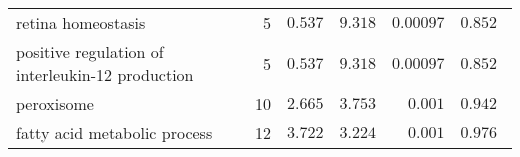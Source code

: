 \begin{longtable}{|l|r|r|r|r|r|}
                                retina homeostasis &                       5 &                $ 0.537$ &   $ 9.318$ &            $0.00097$ &                    $ 0.852~~$ \\
  positive regulation of interleukin-12 production &                       5 &                $ 0.537$ &   $ 9.318$ &            $0.00097$ &                    $ 0.852~~$ \\
                                        peroxisome &                      10 &                $ 2.665$ &   $ 3.753$ &             $ 0.001$ &                    $ 0.942~~$ \\
                      fatty acid metabolic process &                      12 &                $ 3.722$ &   $ 3.224$ &             $ 0.001$ &                    $ 0.976~~$ \\
\end{longtable}
